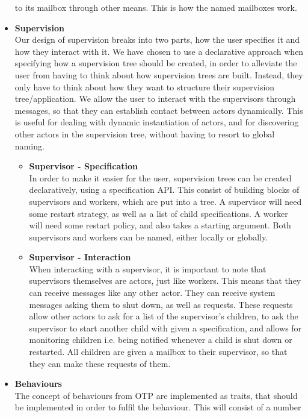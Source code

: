 \documentclass[a4paper]{article}
\begin{document}
\begin{itemize}
  to its mailbox through other means. This is how the named mailboxes work.
\item \textbf{Supervision}\\
  Our design of supervision breaks into two parts, how the user specifies it and
  how they interact with it. We have chosen to use a declarative approach when
  specifying how a supervision tree should be created, in order to alleviate the
  user from having to think about how supervision trees are built. Instead, they
  only have to think about how they want to structure their supervision
  tree/application. We allow the user to interact with the supervisors through
  messages, so that they can establish contact between actors dynamically. This
  is useful for dealing with dynamic instantiation of actors, and for discovering
  other actors in the supervision tree, without having to resort to global
  naming.
  \begin{itemize}
  \item \textbf{Supervisor - Specification}\\
    In order to make it easier for the user, supervision trees can be created
    declaratively, using a specification API. This consist of building blocks of
    supervisors and workers, which are put into a tree.
    A supervisor will need some restart strategy, as well as a list of child
    specifications. A worker will need some restart policy, and also takes a
    starting argument. Both supervisors and workers can be named, either locally
    or globally.
  \item \textbf{Supervisor - Interaction}\\
    When interacting with a supervisor, it is important to note that supervisors
    themselves are actors, just like workers. This means that they can receive
    messages like any other actor. They can receive system messages asking them to
    shut down, as well as requests. These requests allow other actors to ask for a
    list of the supervisor's children, to ask the supervisor to start another
    child with given a specification, and allows for monitoring children i.e.
    being notified whenever a child is shut down or restarted. All children are
    given a mailbox to their supervisor, so that they can make these requests of
    them.
  \end{itemize}
\item \textbf{Behaviours}\\
  The concept of behaviours from OTP are implemented as traits, that should be
  implemented in order to fulfil the behaviour. This will consist of a number

\end{itemize}
\end{document}

